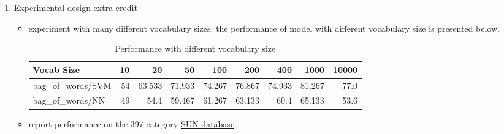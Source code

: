 \begin{enumerate}
    \item Experimental design extra credit
          \begin{itemize}
              \item experiment with many different vocabulary sizes: the performance of model with different vocabulary size is presented below.
                    \begin{table}[h]
                        \centering
                        \begin{tabular}{lrrrrrrrr}
                            \toprule
                            Vocab Size         & 10 & 20     & 50     & 100    & 200    & 400    & 1000   & 10000 \\
                            \midrule
                            bag\_of\_words/SVM & 54 & 63.533 & 71.933 & 74.267 & 76.867 & 74.933 & 81.267 & 77.0  \\
                            bag\_of\_words/NN  & 49 & 54.4   & 59.467 & 61.267 & 63.133 & 60.4   & 65.133 & 53.6  \\
                            \bottomrule
                        \end{tabular}
                        \caption{Performance with different vocabulary size}
                        \label{svm}
                    \end{table}

              \item report performance on the 397-category \hyperlink{https://vision.princeton.edu/projects/2010/SUN/}{SUN database}.

          \end{itemize}
\end{enumerate}


